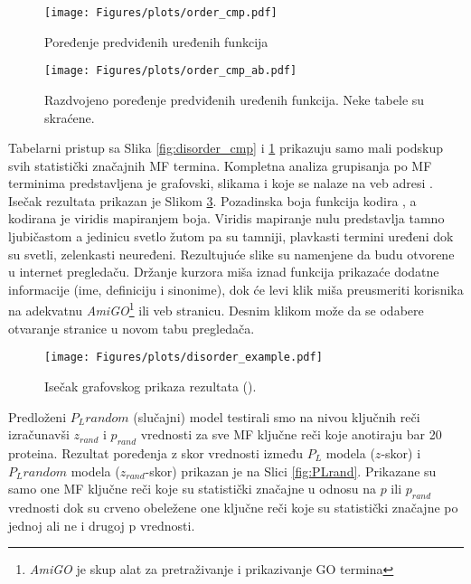 \begin{figure}[th]
\hspace*{-2.0cm} 
\texttt{[image: Figures/plots/order\_cmp.pdf]}
\decoRule
\caption {
  Poređenje predviđenih uređenih funkcija
}
\label{fig:order_cmp}
\end{figure}

\begin{figure}[th]
\hspace*{-0.5cm} 
\texttt{[image: Figures/plots/order\_cmp\_ab.pdf]}
\decoRule
\caption {
  Razdvojeno poređenje predviđenih uređenih funkcija. Neke tabele su skraćene.
}
\label{fig:order_cmp_ab}
\end{figure}


\clearpage

Tabelarni pristup sa Slika \ref{fig:disorder_cmp} i \ref{fig:order_cmp}
prikazuju samo mali podskup svih statistički značajnih MF termina.  Kompletna
analiza grupisanja po MF terminima predstavljena je grafovski, slikama
 i  koje se nalaze na veb adresi
\cite{rezultati}.  Isečak rezultata  prikazan
je Slikom \ref{fig:disorder_example}.  Pozadinska boja funkcija kodira
, a kodirana je viridis \cite{viridis} mapiranjem
boja. Viridis mapiranje nulu predstavlja tamno ljubičastom a jedinicu svetlo
žutom pa su tamniji, plavkasti termini  uređeni dok su svetli, zelenkasti
neuređeni.  Rezultujuće  slike su namenjene da budu otvorene u
internet pregledaču.  Držanje kurzora miša iznad funkcija prikazaće dodatne
informacije (ime, definiciju i sinonime), dok će levi klik miša preusmeriti
korisnika na adekvatnu \textit{AmiGO}\footnote{\textit{AmiGO} je skup alat za
pretraživanje i prikazivanje GO termina } ili \uniprot veb stranicu. Desnim
klikom može da se odabere otvaranje stranice u novom tabu pregledača.

\begin{figure}[th]
\hspace*{-2.0cm} 
\texttt{[image: Figures/plots/disorder\_example.pdf]}
\caption {
  Isečak grafovskog prikaza rezultata ().
}
\label{fig:disorder_example}
\end{figure}


Predloženi $P_L random$ (slučajni) model testirali smo na nivou ključnih reči
izračunavši $z_{rand}$ i  $p_{rand}$ vrednosti za sve MF ključne reči koje
anotiraju bar 20 proteina. Rezultat poređenja z skor vrednosti između $P_L$
modela ($z$-skor) i $P_L random$ modela ($z_{rand}$-skor) prikazan je na Slici
\ref{fig:PLrand}. Prikazane su samo one MF ključne reči koje su statistički
značajne u odnosu na $p$ ili $p_{rand}$ vrednosti dok su crveno obeležene one
ključne reči koje su statistički značajne po jednoj ali ne i drugoj p
vrednosti.


